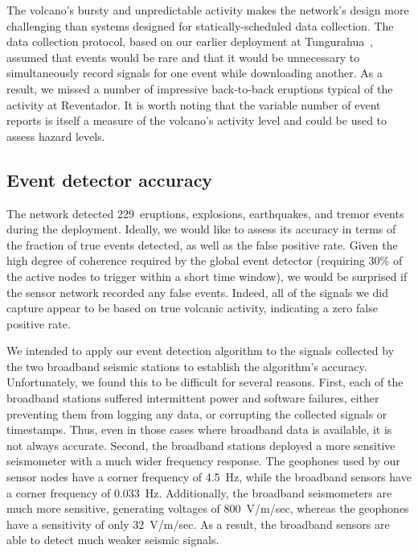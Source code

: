 The volcano's bursty and unpredictable activity makes the network's design more
challenging than systems designed for statically-scheduled data collection.
The data collection protocol, based on our earlier deployment at
Tungurahua~\cite{volcano-ewsn05}, assumed that events would be rare and that
it would be unnecessary to simultaneously record signals for one event while
downloading another. As a result, we missed a number of impressive
back-to-back eruptions typical of the activity at Reventador. It is worth
noting that the variable number of event reports is itself a measure
of the volcano's activity level and could be used to assess hazard levels. 

\subsection{Event detector accuracy}
\label{sec-eventdetectaccuracy}


The network detected 229~eruptions, explosions, earthquakes, and
tremor events during the deployment. Ideally, we would like to assess
its accuracy in terms of the fraction of true events detected, as well
as the false positive rate. Given the high degree of coherence
required by the global event detector (requiring 30\% of the active
nodes to trigger within a short time window), we would be surprised if
the sensor network recorded any false events. Indeed, all of the
signals we did capture appear to be based on true volcanic activity,
indicating a zero false positive rate.

We intended to apply our event detection algorithm to the signals collected 
by the two broadband seismic stations to establish the algorithm's accuracy. 
Unfortunately, we found this to
be difficult for several reasons.  First, each of the broadband stations
suffered intermittent power and software failures, either preventing them
from logging any data, or corrupting the collected signals or timestamps.
Thus, even in those cases where broadband data is available, it is
not always accurate. 
Second, the broadband stations deployed a more
sensitive seismometer with a much wider frequency response. 
The geophones used by our sensor nodes have a corner frequency of
4.5~Hz, while the broadband sensors have a corner frequency of 0.033~Hz. 
Additionally, the broadband seismometers
are much more sensitive, generating voltages of 800~V/m/sec, whereas
the geophones have a sensitivity of only 32~V/m/sec. As a
result, the broadband sensors are able to detect much weaker seismic 
signals.

